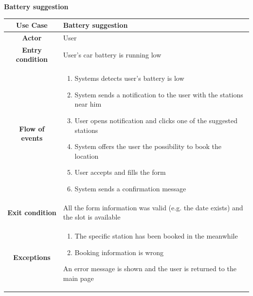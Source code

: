 \documentclass[table, 12pt]{article} %
\begin{document}
\begin{itemize}
            \begin{table}[H]
                \item[] \textbf{Battery suggestion}
                \item[]
                \centering
                \begin{tabular}{|c |m{}|}
                    \hline
                    \textbf{Use Case} & Battery suggestion\\ \hline
                    \textbf{Actor} & User\\ \hline
                    \textbf{Entry condition} & User's car battery is running low \\  \hline
                    \textbf{Flow of events} & \begin{enumerate}
                                                \item Systems detects user's battery is low
                                                \item System sends a notification to the user with the stations near him
                                                \item User opens notification and clicks one of the suggested stations
                                                \item System offers the user the possibility to book the location
                                                \item User accepts and fills the form
                                                \item System sends a confirmation message
                                            \end{enumerate}\\ \hline
                    \textbf{Exit condition} &  All the form information was valid (e.g. the date exists) and the slot is available\\ \hline
                    \textbf{Exceptions} &  \begin{enumerate}
                        \item The specific station has been booked in the meanwhile
                        \item Booking information is wrong
                    \end{enumerate}
                    An error message is shown and the user is returned to the main page\\ \hline
                \end{tabular}
            \end{table}


\end{itemize}
\end{document}
